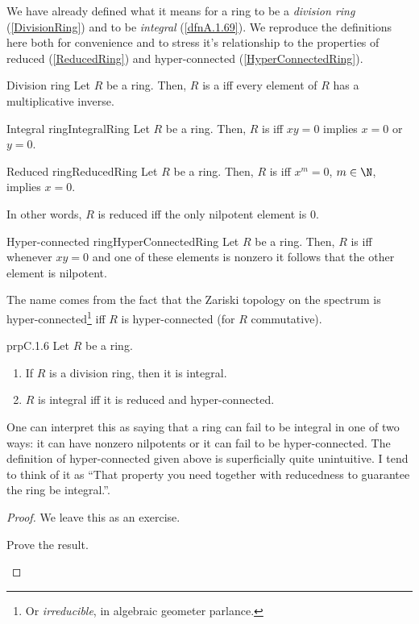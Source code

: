 We have already defined what it means for a ring to be a \emph{division ring} (\cref{DivisionRing}) and to be \emph{integral} (\cref{dfnA.1.69}).  We reproduce the definitions here both for convenience and to stress it's relationship to the properties of reduced (\cref{ReducedRing}) and hyper-connected (\cref{HyperConnectedRing}).
\begin{dfn}{Division ring}{}
	Let $R$ be a ring.  Then, $R$ is a  iff every element of $R$ has a multiplicative inverse.
\end{dfn}
\begin{dfn}{Integral ring}{IntegralRing}
	Let $R$ be a ring.  Then, $R$ is  iff $xy=0$ implies $x=0$ or $y=0$.
\end{dfn}
\begin{dfn}{Reduced ring}{ReducedRing}
	Let $R$ be a ring.  Then, $R$ is  iff $x^m=0$, $m\in \N$, implies $x=0$.
	\begin{rmk}
		In other words, $R$ is reduced iff the only nilpotent element is $0$.
	\end{rmk}
\end{dfn}
\begin{dfn}{Hyper-connected ring}{HyperConnectedRing}
	Let $R$ be a ring.  Then, $R$ is  iff whenever $xy=0$ and one of these elements is nonzero it follows that the other element is nilpotent.
	\begin{rmk}
		The name comes from the fact that the Zariski topology on the spectrum is hyper-connected\footnote{Or \emph{irreducible}, in algebraic geometer parlance.} iff $R$ is hyper-connected (for $R$ commutative).
	\end{rmk}
\end{dfn}
\begin{prp}{}{prpC.1.6}
	Let $R$ be a ring.
	\begin{enumerate}
		\item \label{prpC.1.6(i)}If $R$ is a division ring, then it is integral.
		\item \label{prpC.1.6(ii)}$R$ is integral iff it is reduced and hyper-connected.
	\end{enumerate}
	\begin{rmk}
		One can interpret this as saying that a ring can fail to be integral in one of two ways:  it can have nonzero nilpotents or it can fail to be hyper-connected.  The definition of hyper-connected given above is superficially quite unintuitive.  I tend to think of it as ``That property you need together with reducedness to guarantee the ring be integral.''.
	\end{rmk}
	\begin{proof}
		We leave this as an exercise.
		\begin{exr}[breakable=false]{}{}
			Prove the result.
		\end{exr}
	\end{proof}
\end{prp}

